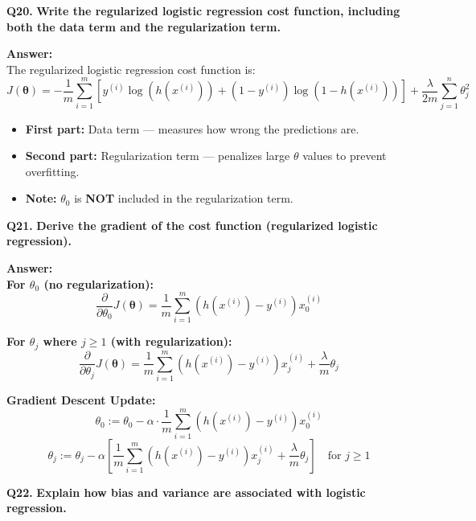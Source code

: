 \documentclass[12pt,a4paper]{article}
\newcommand{\question}[2]{%
    \begin{mdframed}[style=questionstyle]
        \textbf{\textcolor{headerblue}{Q#1.}} \textbf{#2}
    \end{mdframed}%
    \vspace{2pt}%
}
\newcommand{\ans}{\textbf{\textcolor{headerblue}{Answer:}}\\[4pt]}
\newcommand{\subhead}[1]{\textbf{\textcolor{headerblue}{#1}}}
\begin{document}
\vspace{10pt}
\question{20}{Write the regularized logistic regression cost function, including both the data term and the regularization term.}

\ans

The regularized logistic regression cost function is:
\[
J(\boldsymbol{\theta}) = -\frac{1}{m} \sum_{i=1}^{m} \left[ y^{(i)} \log\left(h(x^{(i)})\right) + \left(1 - y^{(i)}\right) \log\left(1 - h(x^{(i)})\right) \right] + \frac{\lambda}{2m} \sum_{j=1}^{n} \theta_j^2
\]

\begin{itemize}[leftmargin=*]
    \item \textbf{First part:} Data term --- measures how wrong the predictions are.
    \item \textbf{Second part:} Regularization term --- penalizes large $\theta$ values to prevent overfitting.
    \item \textbf{Note:} $\theta_0$ is \textbf{NOT} included in the regularization term.
\end{itemize}

\vspace{10pt}
\question{21}{Derive the gradient of the cost function (regularized logistic regression).}

\ans

\subhead{For $\theta_0$ (no regularization):}
\[
\frac{\partial}{\partial \theta_0} J(\boldsymbol{\theta}) = \frac{1}{m} \sum_{i=1}^{m} \left(h(x^{(i)}) - y^{(i)}\right) x_0^{(i)}
\]

\subhead{For $\theta_j$ where $j \geq 1$ (with regularization):}
\[
\frac{\partial}{\partial \theta_j} J(\boldsymbol{\theta}) = \frac{1}{m} \sum_{i=1}^{m} \left(h(x^{(i)}) - y^{(i)}\right) x_j^{(i)} + \frac{\lambda}{m} \theta_j
\]

\subhead{Gradient Descent Update:}
\[
\theta_0 := \theta_0 - \alpha \cdot \frac{1}{m} \sum_{i=1}^{m} \left(h(x^{(i)}) - y^{(i)}\right) x_0^{(i)}
\]
\[
\theta_j := \theta_j - \alpha \left[ \frac{1}{m} \sum_{i=1}^{m} \left(h(x^{(i)}) - y^{(i)}\right) x_j^{(i)} + \frac{\lambda}{m} \theta_j \right] \quad \text{for } j \geq 1
\]

\vspace{10pt}
\question{22}{Explain how bias and variance are associated with logistic regression.}
\end{document}
